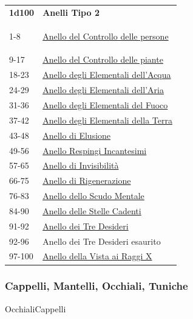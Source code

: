 \begin{multicols}{2}
{{\small\begin{tabular}{ll}
\textbf{1d100} & \textbf{Anelli Tipo 2}\\\hypertarget{Anello Tipo 2}{}
1-8 & \hyperlink{AnellodelControllodellepersone}{Anello del Controllo delle persone}\\
9-17 & \hyperlink{AnellodelControllodellepiante}{Anello del Controllo delle piante}\\
18-23 & \hyperlink{AnellodegliElementalidell'Acqua}{Anello degli Elementali dell'Acqua}\\
24-29 & \hyperlink{AnellodegliElementalidell'Aria}{Anello degli Elementali dell'Aria}\\
31-36 & \hyperlink{AnellodegliElementalidelFuoco}{Anello degli Elementali del Fuoco}\\
37-42 & \hyperlink{AnellodegliElementalidellaTerra}{Anello degli Elementali della Terra}\\
43-48 & \hyperlink{Anello di Elusione}{Anello di Elusione}\\
49-56 & \hyperlink{AnelloRespingiIncantesimi}{Anello Respingi Incantesimi}\\
57-65 & \hyperlink{AnellodiInvisibilità}{Anello di Invisibilità}\\
66-75 & \hyperlink{AnellodiRigenerazione}{Anello di Rigenerazione}\\
76-83 & \hyperlink{AnellodelloScudoMentale}{Anello dello Scudo Mentale}\\
84-90 & \hyperlink{AnellodelleStelleCadenti}{Anello delle Stelle Cadenti}\\
91-92 & \hyperlink{AnellodeiTreDesideri}{Anello dei Tre Desideri}\\
92-96 & Anello dei Tre Desideri esaurito\\
97-100 & \hyperlink{AnellodellaVistaaiRaggiX}{Anello della Vista ai Raggi X}

\end{tabular}}


\subsubsection{Cappelli, Mantelli, Occhiali, Tuniche}\label{cappellimantelli}\hypertarget{Mantelli}{}\hypertarget{Tuniche}{}\hypertarget{Occhiali}{Occhiali}\hypertarget{Cappelli}{Cappelli}

}
\end{multicols}
